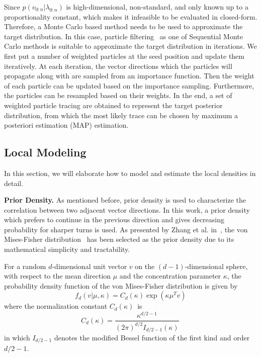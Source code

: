 Since $p({v_{0:n}}|{\lambda_{0:n}})$ is high-dimensional, non-standard, and only known up to a proportionality constant, which makes it infeasible to be evaluated in closed-form. Therefore, a Monte Carlo based method needs to be used to approximate the target distribution. In this case, particle filtering~\cite{doucet2001sequential} as one of Sequential Monte Carlo methods is suitable to approximate the target distribution in iterations. We first put a number of weighted particles at the seed position and update them iteratively. At each iteration, the vector directions which the particles will propagate along with are sampled from an importance function. Then the weight of each particle can be updated based on the importance sampling. Furthermore, the particles can be resampled based on their weights. In the end, a set of weighted particle tracing are obtained to represent the target posterior distribution, from which the most likely trace can be chosen by maximum a posteriori estimation (MAP) estimation.

\subsection{Local Modeling}

In this section, we will elaborate how to model and estimate the local densities in detail.

\noindent\textbf{Prior Density.} As mentioned before, prior density is used to characterize the correlation between two adjacent vector directions. In this work, a prior density which prefers to continue in the previous direction and gives decreasing probability for sharper turns is used. As presented by Zhang et al. in~\cite{Zhang20095}, the von Mises-Fisher distribution~\cite{fisher} has been selected as the prior density due to its mathematical simplicity and tractability.

For a random $d$-dimensional unit vector $v$ on the $(d-1)$-dimensional sphere, with respect to the mean direction $\mu$ and the concentration parameter $\kappa$, the probability density function of the von Mises-Fisher distribution is given by
\begin{equation}
  f_{d}(v| \mu, \kappa)=C_{d}(\kappa)\exp \left( {\kappa \mu^T v } \right)
\end{equation}
where the normalization constant $C_{d}(\kappa)\,$ is
\begin{equation}
  C_{d}(\kappa)=\frac {\kappa^{d/2-1}} {(2\pi)^{d/2}I_{d/2-1}(\kappa)} \,
\end{equation}
in which $I_{d/2-1}$ denotes the modified Bessel function of the first kind and order $d/2-1$.

